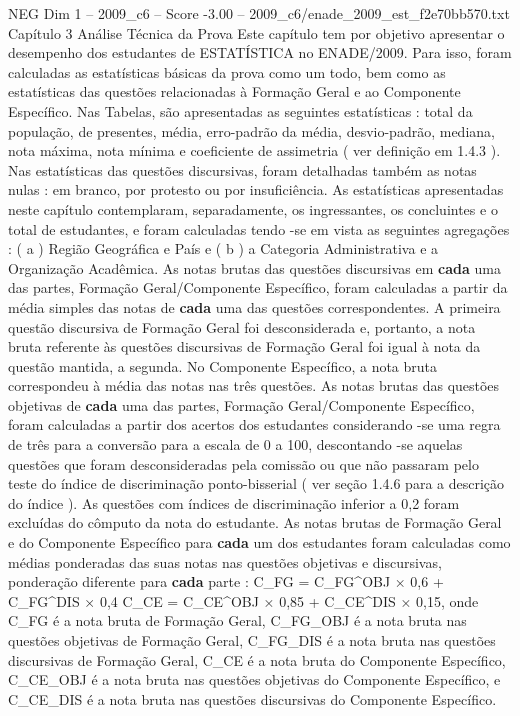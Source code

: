 \begin{textsample}{NEG Dim 1 – 2009\_c6 – Score -3.00 – 2009\_c6/enade\_2009\_est\_f2e70bb570.txt}  \label{ex:f1_neg_218}
Capítulo 3 Análise Técnica da Prova Este capítulo tem por objetivo apresentar o desempenho dos estudantes de ESTATÍSTICA no ENADE/2009.
Para isso, foram calculadas as estatísticas básicas da prova como um todo, bem como as estatísticas das questões relacionadas à Formação Geral e ao Componente Específico.
Nas Tabelas, são apresentadas as seguintes estatísticas : total da população, de presentes, média, erro-padrão da média, desvio-padrão, mediana, nota máxima, nota mínima e coeficiente de assimetria ( ver definição em 1.4.3 ).
Nas estatísticas das questões discursivas, foram detalhadas também as notas nulas : em branco, por protesto ou por insuficiência.
As estatísticas apresentadas neste capítulo contemplaram, separadamente, os ingressantes, os concluintes e o total de estudantes, e foram calculadas tendo -se em vista as seguintes agregações : ( a ) Região Geográfica e País e ( b ) a Categoria Administrativa e a Organização Acadêmica.
As notas brutas das questões discursivas em \textbf{cada} uma das partes, Formação Geral/Componente Específico, foram calculadas a partir da média simples das notas de \textbf{cada} uma das questões correspondentes.
A primeira questão discursiva de Formação Geral foi desconsiderada e, portanto, a nota bruta referente às questões discursivas de Formação Geral foi igual à nota da questão mantida, a segunda.
No Componente Específico, a nota bruta correspondeu à média das notas nas três questões.
As notas brutas das questões objetivas de \textbf{cada} uma das partes, Formação Geral/Componente Específico, foram calculadas a partir dos acertos dos estudantes considerando -se uma regra de três para a conversão para a escala de 0 a 100, descontando -se aquelas questões que foram desconsideradas pela comissão ou que não passaram pelo teste do índice de discriminação ponto-bisserial ( ver seção 1.4.6 para a descrição do índice ).
As questões com índices de discriminação inferior a 0,2 foram excluídas do cômputo da nota do estudante.
As notas brutas de Formação Geral e do Componente Específico para \textbf{cada} um dos estudantes foram calculadas como médias ponderadas das suas notas nas questões objetivas e discursivas, ponderação diferente para \textbf{cada} parte : C\_FG = C\_FG\textasciicircum{}OBJ × 0,6 + C\_FG\textasciicircum{}DIS × 0,4 C\_CE = C\_CE\textasciicircum{}OBJ × 0,85 + C\_CE\textasciicircum{}DIS × 0,15, onde C\_FG é a nota bruta de Formação Geral, C\_FG\_OBJ é a nota bruta nas questões objetivas de Formação Geral, C\_FG\_DIS é a nota bruta nas questões discursivas de Formação Geral, C\_CE é a nota bruta do Componente Específico, C\_CE\_OBJ é a nota bruta nas questões objetivas do Componente Específico, e C\_CE\_DIS é a nota bruta nas questões discursivas do Componente Específico.

\end{textsample}
